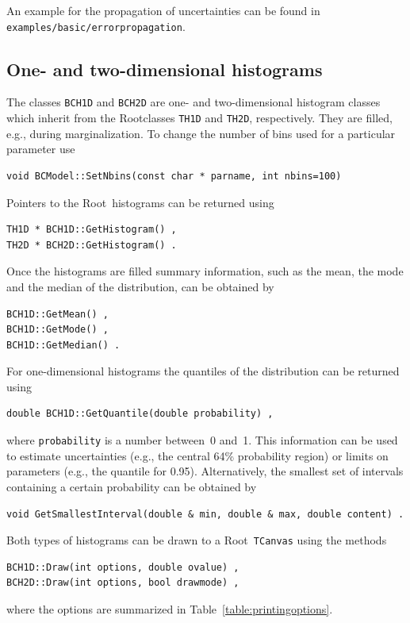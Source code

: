 \documentclass[11pt, a4paper]{article}
\newcommand{\Root}{{\sc Root}}
\begin{document}
\noindent 
An example for the propagation of uncertainties can be found in
\linebreak \verb|examples/basic/errorpropagation|. 


\subsection{One- and two-dimensional histograms}

The classes \verb|BCH1D| and \verb|BCH2D| are one- and two-dimensional
histogram classes which inherit from the \Root\-classes \verb|TH1D|
and \verb|TH2D|, respectively. They are filled, e.g., during
marginalization. To change the number of bins used for a particular parameter
use
%
\begin{verbatim}
void BCModel::SetNbins(const char * parname, int nbins=100)
\end{verbatim}
%
Pointers to the \Root\ histograms can be returned
using
%
\begin{verbatim}
TH1D * BCH1D::GetHistogram() ,
TH2D * BCH2D::GetHistogram() .
\end{verbatim}
%
Once the histograms are filled summary information, such as the mean,
the mode and the median of the distribution, can be obtained by
%
\begin{verbatim}
BCH1D::GetMean() ,
BCH1D::GetMode() ,
BCH1D::GetMedian() .
\end{verbatim}
%
For one-dimensional histograms the quantiles of the distribution can
be returned using
%
\begin{verbatim}
double BCH1D::GetQuantile(double probability) ,
\end{verbatim}
%
where \verb|probability| is a number between~0 and~1. This information
can be used to estimate uncertainties (e.g., the central 64\%
probability region) or limits on parameters (e.g., the quantile for
0.95). Alternatively, the smallest set of intervals containing a
certain probability can be obtained by
%
\begin{verbatim}
void GetSmallestInterval(double & min, double & max, double content) .
\end{verbatim}

\noindent
Both types of histograms can be drawn to a \Root\ \verb|TCanvas| using
the methods
%
\begin{verbatim}
BCH1D::Draw(int options, double ovalue) ,
BCH2D::Draw(int options, bool drawmode) ,
\end{verbatim}
%
where the options are summarized in Table~\ref{table:printingoptions}.
\end{document}

